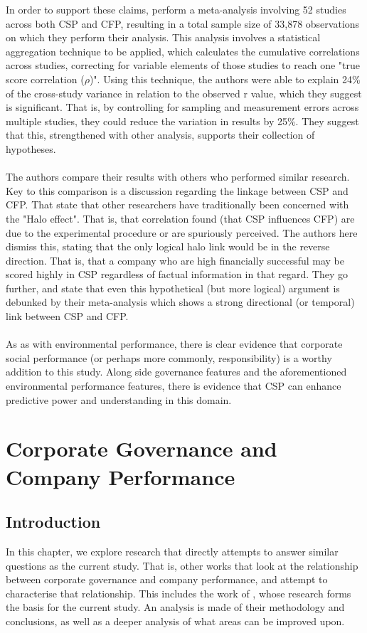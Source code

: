 {In order to support these claims, \cite{orlitzky2003corporate} perform a meta-analysis involving 52 studies across both CSP and CFP, resulting in a total sample size of 33,878 observations on which they perform their analysis. This analysis involves a statistical aggregation technique to be applied, which calculates the cumulative correlations across studies, correcting for variable elements of those studies to reach one "true score correlation ($\rho$)". Using this technique, the authors were able to explain 24\% of the cross-study variance in relation to the observed r value, which they suggest is significant. That is, by controlling for sampling and measurement errors across multiple studies, they could reduce the variation in results by 25\%. They suggest that this, strengthened with other analysis, supports their collection of hypotheses.\\\\
The authors compare their results with others who performed similar research. Key to this comparison is a discussion regarding the linkage between CSP and CFP. That state that other researchers have traditionally been concerned with the "Halo effect". That is, that correlation found (that CSP influences CFP) are due to the experimental procedure or are spuriously perceived. The authors here dismiss this, stating that the only logical halo link would be in the reverse direction. That is, that a company who are high financially successful may be scored highly in CSP regardless of factual information in that regard. They go further, and state that even this hypothetical (but more logical) argument is debunked by their meta-analysis which shows a strong directional (or temporal) link between CSP and CFP. \\\\
As as with environmental performance, there is clear evidence that corporate social performance (or perhaps more commonly, responsibility) is a worthy addition to this study. Along side governance features and the aforementioned environmental performance features, there is evidence that CSP can enhance predictive power and understanding in this domain.    }
\section{Corporate Governance and Company Performance}
\subsection{Introduction}
{In this chapter, we explore research that directly attempts to answer similar questions as the current study. That is, other works that look at the relationship between corporate governance and company performance, and attempt to characterise that relationship. This includes the work of \cite{moldovan2015learning}, whose research forms the basis for the current study. An analysis is made of their methodology and conclusions, as well as a deeper analysis of what areas can be improved upon.}
